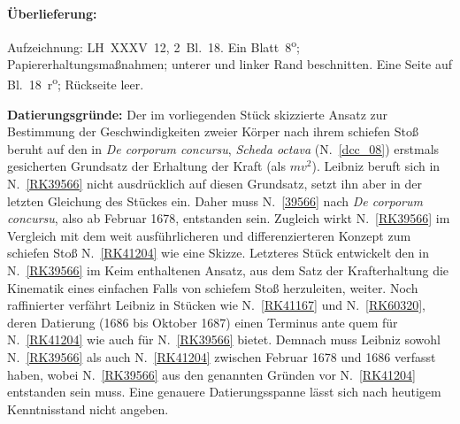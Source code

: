 %  
%
%
\frenchspacing
%
\begin{ledgroupsized}[r]{120mm}
\footnotesize
\pstart
\noindent\textbf{Überlieferung:}
\pend
\end{ledgroupsized}
%
\begin{ledgroupsized}[r]{114mm}
\footnotesize
\pstart \parindent -6mm
%
Aufzeichnung:
LH~XXXV~12, 2~Bl.~18. 
Ein Blatt~8\textsuperscript{o};
Papiererhaltungsmaßnahmen;
unterer und linker Rand beschnitten.
Eine Seite auf Bl.~18~r\textsuperscript{o}; Rückseite leer.
\pend
\end{ledgroupsized}
%
%
\vspace{5mm}
\begin{ledgroup}
\footnotesize
\pstart
\noindent%
\textbf{Datierungsgründe:}
Der im vorliegenden Stück skizzierte Ansatz
%
zur Bestimmung der Geschwindigkeiten zweier Körper nach ihrem schiefen Stoß
%
beruht auf den
%
in \textit{De corporum concursu}, \textit{Scheda octava} (N.~\ref{dcc_08}) erstmals gesicherten Grundsatz der Erhaltung der Kraft (als $mv^2$).
%
Leibniz beruft sich in N.~\ref{RK39566} nicht ausdrücklich auf diesen Grundsatz, 
%
setzt ihn aber in der letzten Gleichung des Stückes ein.
%
Daher muss N.~\ref{39566} nach \textit{De corporum concursu}, also ab Februar 1678, entstanden sein.
%
Zugleich wirkt N.~\ref{RK39566} im Vergleich mit dem weit ausführlicheren und differenzierteren Konzept zum schiefen Stoß 
%
N.~\ref{RK41204} wie eine Skizze. 
%
Letzteres Stück entwickelt den in N.~\ref{RK39566} im Keim enthaltenen Ansatz, aus dem Satz der Krafterhaltung die Kinematik eines einfachen Falls 
%
von schiefem Stoß herzuleiten, weiter.
%
Noch raffinierter verfährt Leibniz in Stücken wie N.~\ref{RK41167} und N.~\ref{RK60320},
%
deren Datierung (1686 bis Oktober 1687) einen Terminus ante quem für N.~\ref{RK41204} wie auch für N.~\ref{RK39566} bietet.
%
Demnach muss Leibniz sowohl N.~\ref{RK39566} als auch N.~\ref{RK41204} zwischen Februar 1678 und 1686 verfasst haben,
%
wobei N.~\ref{RK39566}  aus den genannten Gründen vor N.~\ref{RK41204} entstanden sein muss.
%
Eine genauere Datierungsspanne lässt sich nach heutigem Kenntnisstand nicht angeben.
\pend
\end{ledgroup}
%
%
\frenchspacing
\vspace{8mm}
\pstart%
\normalsize%
\noindent%
